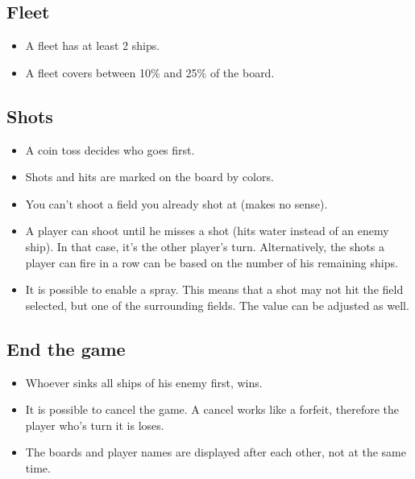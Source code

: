 \documentclass[12pt]{scrartcl}
\begin{document}
	\subsection{Fleet}
	\begin{itemize}
		\item A fleet has at least 2 ships.
		\item A fleet covers between 10\% and 25\% of the board.
	\end{itemize}

	\subsection{Shots}
	\begin{itemize}
		\item A coin toss decides who goes first.
		\item Shots and hits are marked on the board by colors.
		\item You can't shoot a field you already shot at (makes no sense).
		\item A player can shoot until he misses a shot (hits water instead of an enemy ship). In that case, it's the other player's turn. Alternatively, the shots a player can fire in a row can be based on the number of his remaining ships.
		\item It is possible to enable a spray. This means that a shot may not hit the field selected, but one of the surrounding fields. The value can be adjusted as well.
	\end{itemize}

	\subsection{End the game}
	\begin{itemize}
		\item Whoever sinks all ships of his enemy first, wins.
		\item It is possible to cancel the game. A cancel works like a forfeit, therefore the player who's turn it is loses.
		\item The boards and player names are displayed after each other, not at the same time.
	\end{itemize}


	\clearpage
\end{document}
